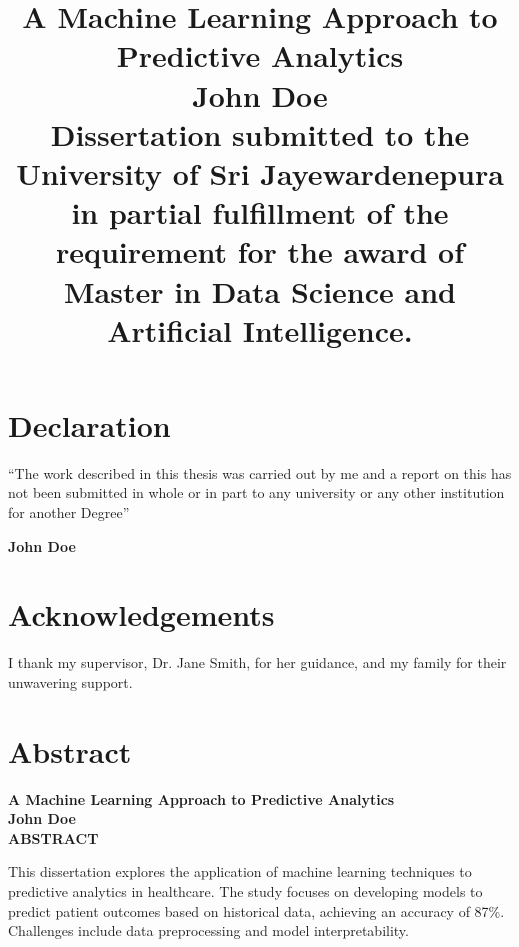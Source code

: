 \documentclass[12pt,a4paper]{article}
\title{
    \vspace{2cm}
    \textbf{A Machine Learning Approach to Predictive Analytics} \\
    \vspace{4cm}
    \large{John Doe} \\
    \vspace{4cm}
    \normalsize{Dissertation submitted to the University of Sri Jayewardenepura in partial fulfillment of the requirement for the award of Master in Data Science and Artificial Intelligence.}
}
\author{}
\date{}
\begin{document}
\maketitle
\thispagestyle{empty}
\newpage

\section*{Declaration}
\vspace{1cm}
``The work described in this thesis was carried out by me and a report on this has not been submitted in whole or in part to any university or any other institution for another Degree''

\vspace{2cm}
\textbf{John Doe}
\thispagestyle{empty}
\newpage

\setcounter{page}{1}
\renewcommand{\thepage}{\roman{page}}

\tableofcontents
\newpage

\listoftables
\listoffigures
\newpage

\section*{Acknowledgements}
I thank my supervisor, Dr. Jane Smith, for her guidance, and my family for their unwavering support.
\newpage

\section*{Abstract}
\begin{center}
    \fontsize{14}{16}\selectfont \textbf{A Machine Learning Approach to Predictive Analytics} \\
    \vspace{0.5cm}
    \fontsize{14}{16}\selectfont \textbf{John Doe} \\
    \vspace{0.5cm}
    \fontsize{14}{16}\selectfont \textbf{ABSTRACT}
\end{center}
\vspace{1cm}
\normalsize
This dissertation explores the application of machine learning techniques to predictive analytics in healthcare. The study focuses on developing models to predict patient outcomes based on historical data, achieving an accuracy of 87\%. Challenges include data preprocessing and model interpretability.
\newpage
\end{document}
